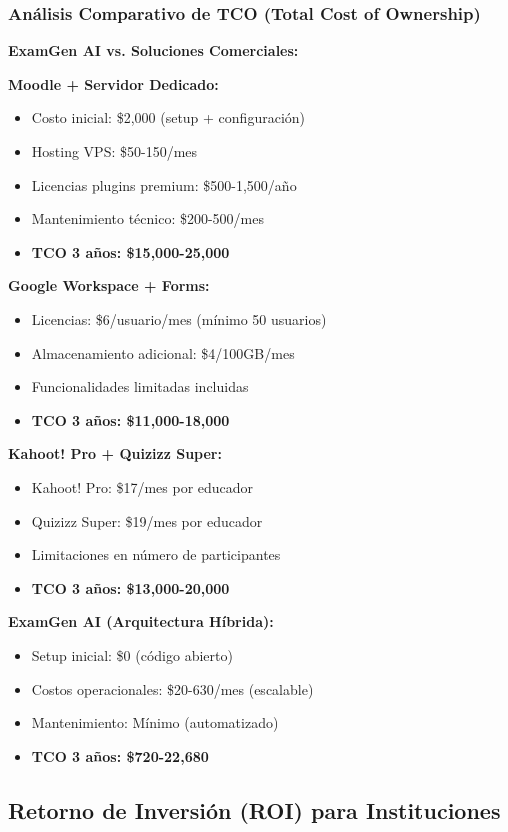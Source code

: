 \documentclass[12pt,a4paper]{report}
\begin{document}
\subsubsection{Análisis Comparativo de TCO (Total Cost of Ownership)}

\textbf{ExamGen AI vs. Soluciones Comerciales:}

\textbf{Moodle + Servidor Dedicado:}
\begin{itemize}
\item Costo inicial: \$2,000 (setup + configuración)
\item Hosting VPS: \$50-150/mes
\item Licencias plugins premium: \$500-1,500/año
\item Mantenimiento técnico: \$200-500/mes
\item \textbf{TCO 3 años: \$15,000-25,000}
\end{itemize}

\textbf{Google Workspace + Forms:}
\begin{itemize}
\item Licencias: \$6/usuario/mes (mínimo 50 usuarios)
\item Almacenamiento adicional: \$4/100GB/mes
\item Funcionalidades limitadas incluidas
\item \textbf{TCO 3 años: \$11,000-18,000}
\end{itemize}

\textbf{Kahoot! Pro + Quizizz Super:}
\begin{itemize}
\item Kahoot! Pro: \$17/mes por educador
\item Quizizz Super: \$19/mes por educador
\item Limitaciones en número de participantes
\item \textbf{TCO 3 años: \$13,000-20,000}
\end{itemize}

\textbf{ExamGen AI (Arquitectura Híbrida):}
\begin{itemize}
\item Setup inicial: \$0 (código abierto)
\item Costos operacionales: \$20-630/mes (escalable)
\item Mantenimiento: Mínimo (automatizado)
\item \textbf{TCO 3 años: \$720-22,680}
\end{itemize}

\subsection{Retorno de Inversión (ROI) para Instituciones}
\end{document}
